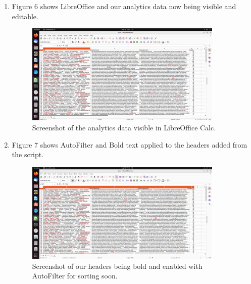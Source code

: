 \documentclass{article}
\begin{document}
\begin{enumerate}
\begin{figure}[ht!]
                \end{figure}
            \item Figure 6 shows LibreOffice and our analytics data now being visible and editable.
                \begin{figure}[ht!] %
                \centering
                \caption{\label{fig:TableOfContentsSnippet.png}Screenshot of the analytics data visible in LibreOffice Calc.}
                \includegraphics[width=0.89\textwidth, height=0.5\textwidth]{2023-09-10 17 41 42.png}
                \end{figure}
            \item Figure 7 shows AutoFilter and Bold text applied to the headers added from the script.
                \begin{figure}[ht!] %
                \centering
                \caption{\label{fig:TableOfContentsSnippet.png}Screenshot of our headers being bold and enabled with AutoFilter for sorting soon.}
                \includegraphics[width=0.89\textwidth, height=0.5\textwidth]{2023-09-10 17 44 56.png}

\end{figure}
\end{enumerate}
\end{document}
